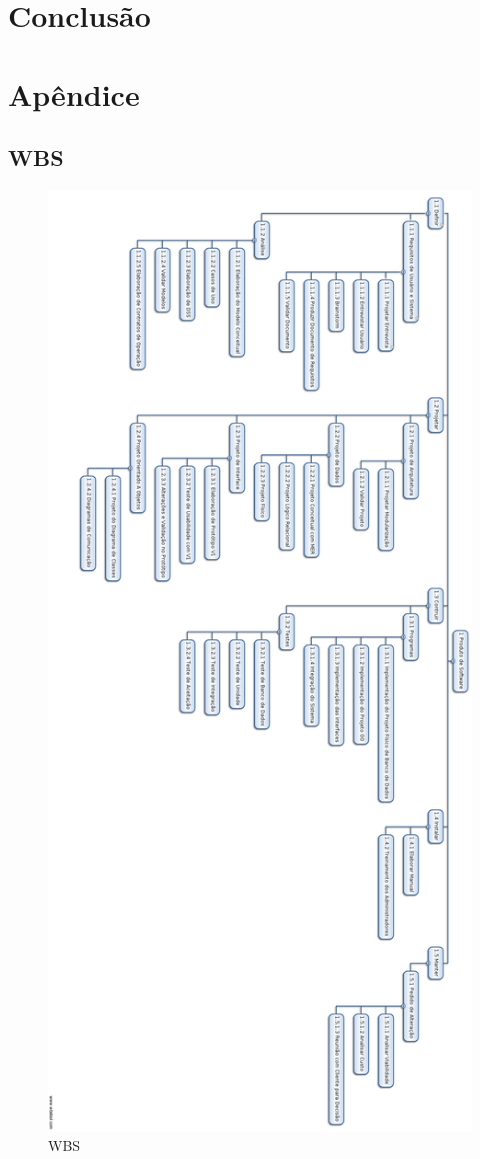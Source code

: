 \documentclass[a4paper,11pt]{article}
\begin{document}
\section{Conclusão}

\section{Apêndice}\label{apendice}
	\subsection{WBS}
	\begin{figure}[!Htb]
    	\centering
        \includegraphics[height=\textheight]{WBS.png}
        \caption{WBS}
     	\label{WBS}
    \end{figure}
\end{document}
